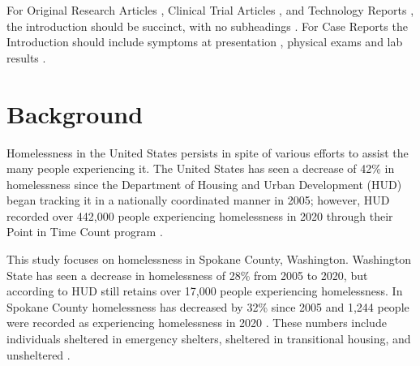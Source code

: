 \documentclass[utf8]{frontiersFPHY} %
\begin{document}
For Original Research Articles \citep{conference}, Clinical Trial Articles \citep{article}, and Technology Reports \citep{patent}, the introduction should be succinct, with no subheadings \citep{book}. For Case Reports the Introduction should include symptoms at presentation \citep{chapter}, physical exams and lab results \citep{dataset}.




\section{Background}
Homelessness in the United States persists in spite of various efforts to assist the many people experiencing it. The United States has seen a decrease of 42\% in homelessness since the Department of Housing and Urban Development (HUD) began tracking it in a nationally coordinated manner in 2005; however, HUD recorded over 442,000 people experiencing homelessness in 2020 through their Point in Time Count program \cite{PITcount}. 

This study focuses on homelessness in Spokane County, Washington. Washington State has seen a decrease in homelessness of 28\% from 2005 to 2020, but according to HUD still retains over 17,000 people experiencing homelessness. In Spokane County homelessness has decreased by 32\% since 2005 and 1,244 people were recorded as experiencing homelessness in 2020 \cite{PITcount}. These numbers include individuals sheltered in emergency shelters, sheltered in transitional housing, and unsheltered \cite{PITcount}.
\end{document}
